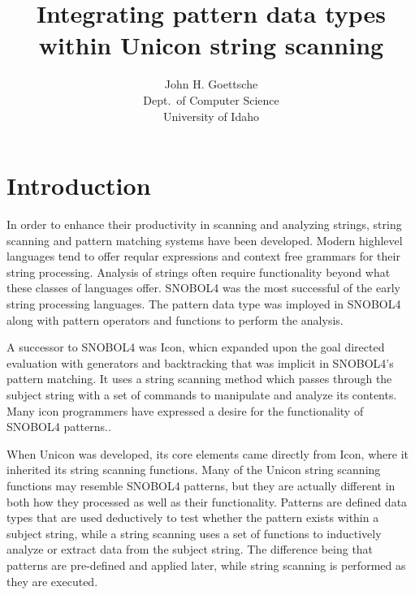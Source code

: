 \documentclass{article}
\begin{document}
\title{Integrating pattern data types within Unicon string scanning}
\author{John H. Goettsche\\
  Dept.\ of Computer Science\\
  University of Idaho}

\maketitle

\begin{abstract}


\end{abstract}

\section{Introduction}
In order to enhance their productivity in scanning and analyzing strings, string scanning and pattern matching systems have been developed.  Modern highlevel languages tend to offer reqular expressions and context free grammars for their string processing.  Analysis of strings often require functionality beyond what these classes of languages offer.  SNOBOL4 was the most successful of the early string processing languages.\cite{Gaikaiwari2005}  The pattern data type was imployed in SNOBOL4 along with pattern operators and functions to perform the analysis.

A successor to SNOBOL4 was Icon, whicn expanded upon the goal directed evaluation with generators and backtracking that was implicit in SNOBOL4's pattern matching.\cite{Gaikaiwari2005}  It uses a string scanning method which passes through the subject string with a set of commands to manipulate and analyze its contents.  Many icon programmers have expressed a desire for the functionality of SNOBOL4 patterns.\cite{Griswold1980}.

When Unicon was developed, its core elements came directly from Icon, where it inherited its string scanning functions.\cite{JefferyUnicon}  Many of the Unicon string scanning functions may resemble SNOBOL4 patterns, but they are actually different in both how they processed as well as their functionality.  Patterns are defined data types that are used deductively to test whether the pattern exists within a subject string, while a string scanning uses a set of functions to inductively analyze or extract data from the subject string.  The difference being that patterns are pre-defined and applied later, while string scanning is performed as they are executed.
\end{document}

